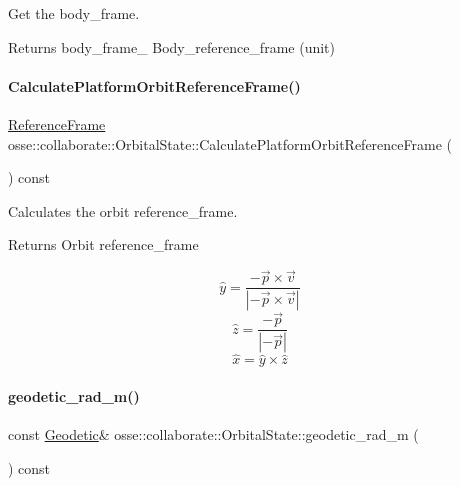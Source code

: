 Get the body\+\_\+frame. 

\begin{DoxyReturn}{Returns}
body\+\_\+frame\+\_\+ Body\+\_\+reference\+\_\+frame (unit) 
\end{DoxyReturn}
\mbox{\label{classosse_1_1collaborate_1_1_orbital_state_a0ed1213527f9cbe7a6131feb4308046e}} 
\paragraph{\texorpdfstring{Calculate\+Platform\+Orbit\+Reference\+Frame()}{CalculatePlatformOrbitReferenceFrame()}}
{\footnotesize\ttfamily \hyperlink{classosse_1_1collaborate_1_1_reference_frame}{Reference\+Frame} osse\+::collaborate\+::\+Orbital\+State\+::\+Calculate\+Platform\+Orbit\+Reference\+Frame (\begin{DoxyParamCaption}{ }\end{DoxyParamCaption}) const}



Calculates the orbit reference\+\_\+frame. 

\begin{DoxyReturn}{Returns}
Orbit reference\+\_\+frame
\end{DoxyReturn}
\[ \hat{y} = \frac{-\vec{p}\times\vec{v}} {\left\lvert-\vec{p}\times\vec{v}\right\rvert} \] \[ \hat{z} = \frac{-\vec{p}}{\left\lvert-\vec{p}\right\rvert} \] \[ \hat{x} = \hat{y}\times\hat{z} \] \mbox{\label{classosse_1_1collaborate_1_1_orbital_state_a7a6f749d24d80b5e5c08eb4a03857a31}} 
\paragraph{\texorpdfstring{geodetic\+\_\+rad\+\_\+m()}{geodetic\_rad\_m()}}
{\footnotesize\ttfamily const \hyperlink{classosse_1_1collaborate_1_1_geodetic}{Geodetic}\& osse\+::collaborate\+::\+Orbital\+State\+::geodetic\+\_\+rad\+\_\+m (\begin{DoxyParamCaption}{ }\end{DoxyParamCaption}) const\hspace{0.3cm}{\ttfamily [inline]}}



